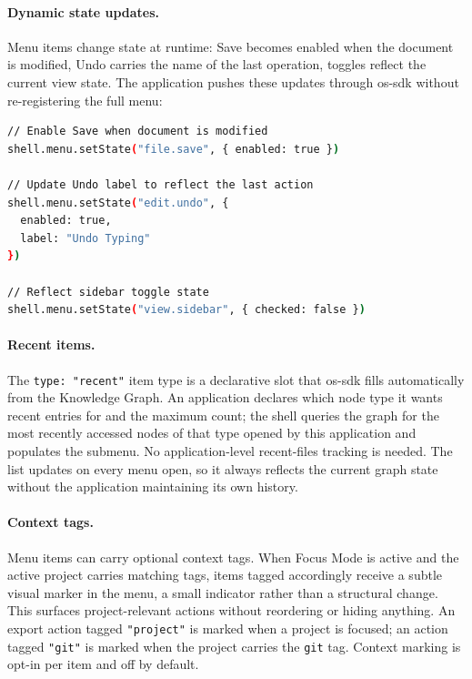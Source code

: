 \paragraph{Dynamic state updates.}
Menu items change state at runtime: Save becomes enabled when the document is
modified, Undo carries the name of the last operation, toggles reflect the
current view state. The application pushes these updates through os-sdk
without re-registering the full menu:

\begin{lstlisting}[language=bash, caption={Runtime menu state updates}]
// Enable Save when document is modified
shell.menu.setState("file.save", { enabled: true })

// Update Undo label to reflect the last action
shell.menu.setState("edit.undo", {
  enabled: true,
  label: "Undo Typing"
})

// Reflect sidebar toggle state
shell.menu.setState("view.sidebar", { checked: false })
\end{lstlisting}

\paragraph{Recent items.}
The \texttt{type: "recent"} item type is a declarative slot that os-sdk fills
automatically from the Knowledge Graph. An application declares which node
type it wants recent entries for and the maximum count; the shell queries the
graph for the most recently accessed nodes of that type opened by this
application and populates the submenu. No application-level recent-files
tracking is needed. The list updates on every menu open, so it always reflects
the current graph state without the application maintaining its own history.

\paragraph{Context tags.}
Menu items can carry optional context tags. When Focus Mode is active and the
active project carries matching tags, items tagged accordingly receive a subtle
visual marker in the menu, a small indicator rather than a structural change. This
surfaces project-relevant actions without reordering or hiding anything. An
export action tagged \texttt{"project"} is marked when a project is focused;
an action tagged \texttt{"git"} is marked when the project carries the
\texttt{git} tag. Context marking is opt-in per item and off by default.

